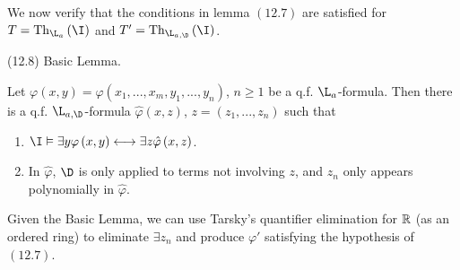 We now verify that the conditions in lemma $\left(12.7\right)$ are
satisfied for $T=\mathrm{Th}_{\L_{a}}\left(\I\right)$ and $T'=\mathrm{Th}_{\L_{a,\D}}\left(\I\right)$.
\begin{lem*}
(12.8) Basic Lemma.

Let $\varphi\left(x,y\right)=\varphi\left(x_{1},...,x_{m},y_{1},...,y_{n}\right)$,
$n\geq1$ be a q.f. $\L_{a}$-formula. Then there is a q.f. $\L_{a,\D}$-formula
$\hat{\varphi}\left(x,z\right)$, $z=\left(z_{1},...,z_{n}\right)$
such that
\begin{enumerate}
\item $\I\model\exists y\varphi\left(x,y\right)\longleftrightarrow\exists z\hat{\varphi}\left(x,z\right)$.
\item In $\hat{\varphi}$, $\D$ is only applied to terms not involving
$z$, and $z_{n}$ only appears polynomially in $\hat{\varphi}$.
\end{enumerate}
\end{lem*}
Given the Basic Lemma, we can use Tarsky's quantifier elimination
for $\mathbb{R}$ (as an ordered ring) to eliminate $\exists z_{n}$ and produce
$\varphi'$ satisfying the hypothesis of $\left(12.7\right)$.

